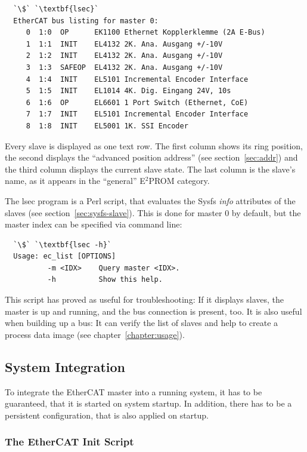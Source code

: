 \documentclass[a4paper,12pt,BCOR6mm,bibtotoc,idxtotoc]{scrbook}
\begin{document}
\begin{lstlisting}
  `\$` `\textbf{lsec}`
  EtherCAT bus listing for master 0:
     0  1:0  OP      EK1100 Ethernet Kopplerklemme (2A E-Bus)
     1  1:1  INIT    EL4132 2K. Ana. Ausgang +/-10V
     2  1:2  INIT    EL4132 2K. Ana. Ausgang +/-10V
     3  1:3  SAFEOP  EL4132 2K. Ana. Ausgang +/-10V
     4  1:4  INIT    EL5101 Incremental Encoder Interface
     5  1:5  INIT    EL1014 4K. Dig. Eingang 24V, 10s
     6  1:6  OP      EL6601 1 Port Switch (Ethernet, CoE)
     7  1:7  INIT    EL5101 Incremental Encoder Interface
     8  1:8  INIT    EL5001 1K. SSI Encoder
\end{lstlisting}

Every slave is displayed as one text row. The first column shows its
ring position, the second displays the ``advanced position address''
(see section~\ref{sec:addr}) and the third column displays the current
slave state. The last column is the slave's name, as it appears in the
``general'' E$^2$PROM category.

The lsec program is a Perl script, that evaluates the Sysfs
\textit{info} attributes of the slaves (see
section~\ref{sec:sysfs-slave}). This is done for master $0$ by
default, but the master index can be specified via command line:

\begin{lstlisting}
  `\$` `\textbf{lsec -h}`
  Usage: ec_list [OPTIONS]
          -m <IDX>    Query master <IDX>.
          -h          Show this help.
\end{lstlisting}

This script has proved as useful for troubleshooting: If it displays
slaves, the master is up and running, and the bus connection is
present, too. It is also useful when building up a bus: It can verify
the list of slaves and help to create a process data image (see
chapter~\ref{chapter:usage}).


\subsection{System Integration}
\label{sec:system}

To integrate the EtherCAT master into a running system, it has to be
guaranteed, that it is started on system startup. In addition, there has
to be a persistent configuration, that is also applied on startup.

\subsubsection{The EtherCAT Init Script}
\label{sec:init}
\end{document}
